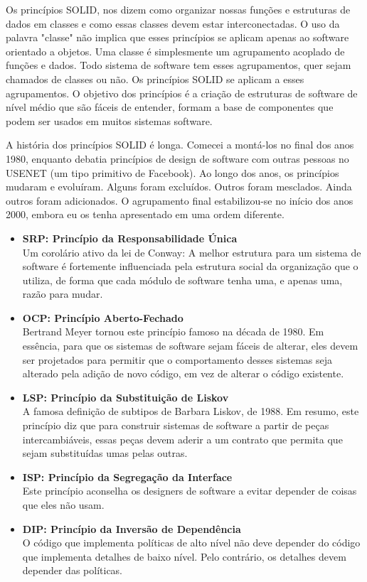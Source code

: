 \documentclass[12pt, %
openright, 
oneside, %
a4paper,    %
brazil]{facom-ufu-abntex2}
\begin{document}
Os princípios SOLID, nos dizem como organizar nossas funções e estruturas de
dados em classes e como essas classes devem estar interconectadas. O uso da
palavra "classe" não implica que esses princípios se aplicam apenas ao software
orientado a objetos. Uma classe é simplesmente um agrupamento acoplado de
funções e dados. Todo sistema de software tem esses agrupamentos, quer sejam
chamados de classes ou não. Os princípios SOLID se aplicam a esses
agrupamentos. O objetivo dos princípios é a criação de estruturas de software
de nível médio que são fáceis de entender, formam a base de componentes que
podem ser usados em muitos sistemas software.

A história dos princípios SOLID é longa. Comecei a montá-los no final dos anos
1980, enquanto debatia princípios de design de software com outras pessoas no
USENET (um tipo primitivo de Facebook). Ao longo dos anos, os princípios
mudaram e evoluíram. Alguns foram excluídos. Outros foram mesclados. Ainda
outros foram adicionados. O agrupamento final estabilizou-se no início dos anos
2000, embora eu os tenha apresentado em uma ordem diferente.

\begin{itemize}
	\item \textbf{SRP: Princípio da Responsabilidade Única}\\
	      Um corolário ativo da lei de Conway: A melhor estrutura para um sistema de software é fortemente influenciada pela estrutura social da organização que o utiliza, de forma que cada módulo de software tenha uma, e apenas uma, razão para mudar.

	\item \textbf{OCP: Princípio Aberto-Fechado}\\
	      Bertrand Meyer tornou este princípio famoso na década de 1980. Em essência, para que os sistemas de software sejam fáceis de alterar, eles devem ser projetados para permitir que o comportamento desses sistemas seja alterado pela adição de novo código, em vez de alterar o código existente.

	\item \textbf{LSP: Princípio da Substituição de Liskov}\\
	      A famosa definição de subtipos de Barbara Liskov, de 1988. Em resumo, este princípio diz que para construir sistemas de software a partir de peças intercambiáveis, essas peças devem aderir a um contrato que permita que sejam substituídas umas pelas outras.

	\item \textbf{ISP: Princípio da Segregação da Interface}\\
	      Este princípio aconselha os designers de software a evitar depender de coisas que eles não usam.

	\item \textbf{DIP: Princípio da Inversão de Dependência}\\
	      O código que implementa políticas de alto nível não deve depender do código que implementa detalhes de baixo nível. Pelo contrário, os detalhes devem depender das políticas.
\end{itemize}
\end{document}
